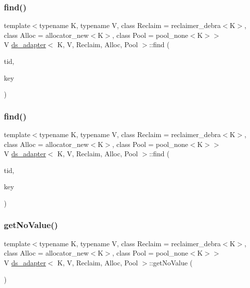 \subsubsection{\texorpdfstring{find()}{find()}\hspace{0.1cm}{\footnotesize\ttfamily [25/26]}}
{\footnotesize\ttfamily template$<$typename K, typename V, class Reclaim = reclaimer\+\_\+debra$<$\+K$>$, class Alloc = allocator\+\_\+new$<$\+K$>$, class Pool = pool\+\_\+none$<$\+K$>$$>$ \\
V \hyperlink{classds__adapter}{ds\+\_\+adapter}$<$ K, V, Reclaim, Alloc, Pool $>$\+::find (\begin{DoxyParamCaption}\item[{const int}]{tid,  }\item[{const K \&}]{key }\end{DoxyParamCaption})\hspace{0.3cm}{\ttfamily [inline]}}

\mbox{\label{classds__adapter_a0109b0d011810f687c9e9273eb1d1bc8}} 
\subsubsection{\texorpdfstring{find()}{find()}\hspace{0.1cm}{\footnotesize\ttfamily [26/26]}}
{\footnotesize\ttfamily template$<$typename K, typename V, class Reclaim = reclaimer\+\_\+debra$<$\+K$>$, class Alloc = allocator\+\_\+new$<$\+K$>$, class Pool = pool\+\_\+none$<$\+K$>$$>$ \\
V \hyperlink{classds__adapter}{ds\+\_\+adapter}$<$ K, V, Reclaim, Alloc, Pool $>$\+::find (\begin{DoxyParamCaption}\item[{const int}]{tid,  }\item[{const K \&}]{key }\end{DoxyParamCaption})\hspace{0.3cm}{\ttfamily [inline]}}

\mbox{\label{classds__adapter_a9e1e4aec136b351d1a6820d70484a6c5}} 
\subsubsection{\texorpdfstring{get\+No\+Value()}{getNoValue()}\hspace{0.1cm}{\footnotesize\ttfamily [1/26]}}
{\footnotesize\ttfamily template$<$typename K, typename V, class Reclaim = reclaimer\+\_\+debra$<$\+K$>$, class Alloc = allocator\+\_\+new$<$\+K$>$, class Pool = pool\+\_\+none$<$\+K$>$$>$ \\
V \hyperlink{classds__adapter}{ds\+\_\+adapter}$<$ K, V, Reclaim, Alloc, Pool $>$\+::get\+No\+Value (\begin{DoxyParamCaption}{ }\end{DoxyParamCaption})\hspace{0.3cm}{\ttfamily [inline]}}

